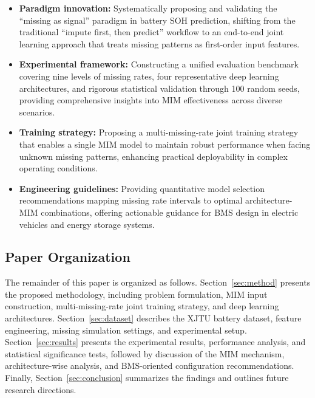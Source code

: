 \documentclass[5p,times]{elsarticle}
\begin{document}
\begin{itemize}
    \item \textbf{Paradigm innovation:} Systematically proposing and validating the ``missing as signal'' paradigm in battery SOH prediction, shifting from the traditional ``impute first, then predict'' workflow to an end-to-end joint learning approach that treats missing patterns as first-order input features.
    
    \item \textbf{Experimental framework:} Constructing a unified evaluation benchmark covering nine levels of missing rates, four representative deep learning architectures, and rigorous statistical validation through 100 random seeds, providing comprehensive insights into MIM effectiveness across diverse scenarios.
    
    \item \textbf{Training strategy:} Proposing a multi-missing-rate joint training strategy that enables a single MIM model to maintain robust performance when facing unknown missing patterns, enhancing practical deployability in complex operating conditions.
    
    \item \textbf{Engineering guidelines:} Providing quantitative model selection recommendations mapping missing rate intervals to optimal architecture-MIM combinations, offering actionable guidance for BMS design in electric vehicles and energy storage systems.
\end{itemize}

\subsection{Paper Organization}\label{sec:organization}

The remainder of this paper is organized as follows. Section~\ref{sec:method} presents the proposed methodology, including problem formulation, MIM input construction, multi-missing-rate joint training strategy, and deep learning architectures. Section~\ref{sec:dataset} describes the XJTU battery dataset, feature engineering, missing simulation settings, and experimental setup. Section~\ref{sec:results} presents the experimental results, performance analysis, and statistical significance tests, followed by discussion of the MIM mechanism, architecture-wise analysis, and BMS-oriented configuration recommendations. Finally, Section~\ref{sec:conclusion} summarizes the findings and outlines future research directions.
\end{document}
